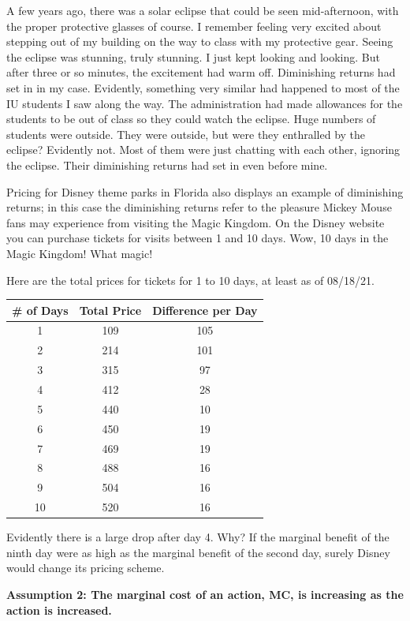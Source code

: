 \documentclass[
]{book}
\begin{document}
A few years ago, there was a solar eclipse that could be seen mid-afternoon, with the proper protective glasses of course. I remember feeling very excited about stepping out of my building on the way to class with my protective gear. Seeing the eclipse was stunning, truly stunning. I just kept looking and looking. But after three or so minutes, the excitement had warm off. Diminishing returns had set in in my case. Evidently, something very similar had happened to most of the IU students I saw along the way. The administration had made allowances for the students to be out of class so they could watch the eclipse. Huge numbers of students were outside. They were outside, but were they enthralled by the eclipse? Evidently not. Most of them were just chatting with each other, ignoring the eclipse. Their diminishing returns had set in even before mine.

Pricing for Disney theme parks in Florida also displays an example of diminishing returns; in this case the diminishing returns refer to the pleasure Mickey Mouse fans may experience from visiting the Magic Kingdom. On the Disney website you can purchase tickets for visits between 1 and 10 days. Wow, 10 days in the Magic Kingdom! What magic!

Here are the total prices for tickets for 1 to 10 days, at least as of 08/18/21.

\begin{longtable}[]{@{}ccc@{}}
\toprule
\# of Days & Total Price & Difference per Day \\
\midrule
\endhead
1 & 109 & 105 \\
2 & 214 & 101 \\
3 & 315 & 97 \\
4 & 412 & 28 \\
5 & 440 & 10 \\
6 & 450 & 19 \\
7 & 469 & 19 \\
8 & 488 & 16 \\
9 & 504 & 16 \\
10 & 520 & 16 \\
\bottomrule
\end{longtable}

Evidently there is a large drop after day 4. Why? If the marginal benefit of the ninth day were as high as the marginal benefit of the second day, surely Disney would change its pricing scheme.

\begin{center}
\textbf{Assumption 2: The marginal cost of an action, MC, is increasing as the action is increased.}

\end{center}
\end{document}
